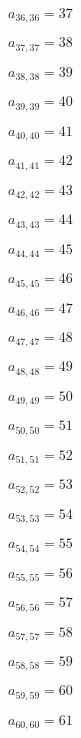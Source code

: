 \documentclass[a4paper,12pt]{article}
\begin{document}
$a _{ 36, 36 } = 37$

$a _{ 37, 37 } = 38$

$a _{ 38, 38 } = 39$

$a _{ 39, 39 } = 40$

$a _{ 40, 40 } = 41$

$a _{ 41, 41 } = 42$

$a _{ 42, 42 } = 43$

$a _{ 43, 43 } = 44$

$a _{ 44, 44 } = 45$

$a _{ 45, 45 } = 46$

$a _{ 46, 46 } = 47$

$a _{ 47, 47 } = 48$

$a _{ 48, 48 } = 49$

$a _{ 49, 49 } = 50$

$a _{ 50, 50 } = 51$

$a _{ 51, 51 } = 52$

$a _{ 52, 52 } = 53$

$a _{ 53, 53 } = 54$

$a _{ 54, 54 } = 55$

$a _{ 55, 55 } = 56$

$a _{ 56, 56 } = 57$

$a _{ 57, 57 } = 58$

$a _{ 58, 58 } = 59$

$a _{ 59, 59 } = 60$

$a _{ 60, 60 } = 61$
\end{document}
